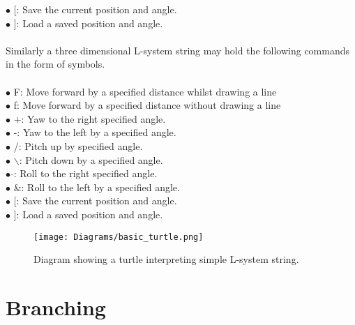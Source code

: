 $\bullet$ $[$: 				\hspace{10mm} 		Save the current position and angle. \\
$\bullet$ $]$: 				\hspace{10mm} 		Load a saved position and angle. \\
\\
Similarly a three dimensional L-system string may hold the following commands in the form of symbols. \\
\\ 
$\bullet$ F: 				\hspace{10mm}  		Move forward by a specified distance whilst drawing a line \\
$\bullet$ f: 				\hspace{10mm} 		Move forward by a specified distance without drawing a line \\
$\bullet$ +: 				\hspace{10mm} 		Yaw to the right specified angle. \\
$\bullet$ -: 				\hspace{10mm} 		Yaw to the left by a specified angle.  \\
$\bullet$ /: 				\hspace{10mm} 		Pitch up by specified angle. \\
$\bullet$ $\backslash$: 	\hspace{10mm} 		Pitch down by a specified angle.  \\
$\bullet$ $\hat{}$: 		\hspace{10mm} 		Roll to the right specified angle. \\
$\bullet$ \&:				\hspace{10mm}  		Roll to the left by a specified angle.  \\
$\bullet$ $[$: 				\hspace{10mm} 		Save the current position and angle. \\
$\bullet$ $]$: 				\hspace{10mm}		Load a saved position and angle. \\

\begin{figure}[htbp]
	{\centering
		\vspace{7px}
		\texttt{[image: Diagrams/basic\_turtle.png]}
		\caption{Diagram showing a turtle interpreting simple L-system string.}
	}
\end{figure}
\FloatBarrier

\section{Branching}

